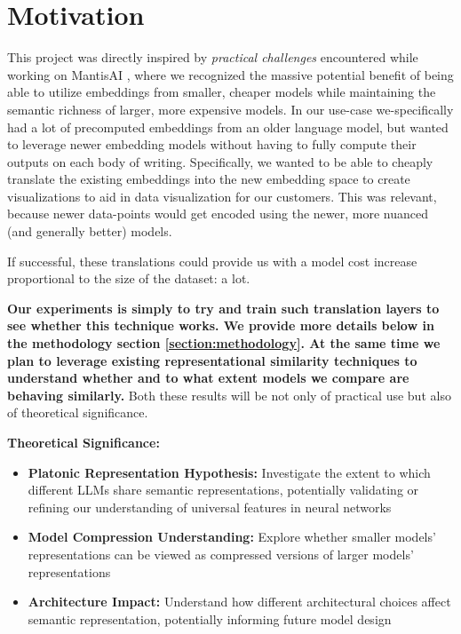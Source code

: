 \documentclass[9pt,letterpaper]{article}
\begin{document}
\section*{Motivation} \label{section:motivation}

This project was directly inspired by \textit{practical challenges} encountered while working on MantisAI \cite{noauthor_mantis_nodate}, where we recognized the massive potential benefit of being able to utilize embeddings from smaller, cheaper models while maintaining the semantic richness of larger, more expensive models. In our use-case we-specifically had a lot of precomputed embeddings from an older language model, but wanted to leverage newer embedding models without having to fully compute their outputs on each body of writing. Specifically, we wanted to be able to cheaply translate the existing embeddings into the new embedding space to create visualizations to aid in data visualization for our customers. This was relevant, because newer data-points would get encoded using the newer, more nuanced (and generally better) models.

If successful, these translations could provide us with a model cost increase proportional to the size of the dataset: a lot.

\textbf{Our experiments is simply to try and train such translation layers to see whether this technique works. We provide more details below in the methodology section \ref{section:methodology}. At the same time we plan to leverage existing representational similarity techniques to understand whether and to what extent models we compare are behaving similarly.} Both these results will be not only of practical use but also of theoretical significance.

\textbf{Theoretical Significance:}
\begin{itemize}
    \item \textbf{Platonic Representation Hypothesis:} Investigate the extent to which different LLMs share semantic representations, potentially validating or refining our understanding of universal features in neural networks
    \item \textbf{Model Compression Understanding:} Explore whether smaller models' representations can be viewed as compressed versions of larger models' representations
    \item \textbf{Architecture Impact:} Understand how different architectural choices affect semantic representation, potentially informing future model design
\end{itemize}
\end{document}
